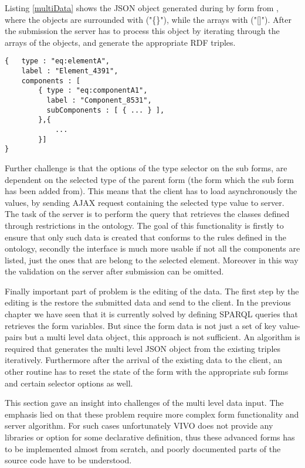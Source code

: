 Listing \ref{multiData} shows the JSON object generated during by form from , where the objects are surrounded with ("\{\}"), while the arrays with ("[]"). After the submission the server has to process this object by iterating through the arrays of the objects, and generate the appropriate RDF triples.

\begin{lstlisting}[basicstyle=\footnotesize, frame=single, caption={Multi level form data in JSON}, label=multiData, captionpos=b, belowskip=1em, aboveskip=2em]
{	type : "eq:elementA",
	label : "Element_4391",
	components : [
		{ type : "eq:componentA1",
		  label : "Component_8531",	
		  subComponents : [ { ... } ],
		},{ 
			... 
		}]
}
\end{lstlisting}

Further challenge is that the options of the type selector on the sub forms, are dependent on the selected type of the parent form (the form which the sub form has been added from). This means that the client has to load asynchronously the values, by sending AJAX request containing the selected type value to server. The task of the server is to perform the query that retrieves the classes defined through restrictions in the ontology. The goal of this functionality is firstly to ensure that only such data is created that conforms to the rules defined in the ontology, secondly the interface is much more usable if not all the components are listed, just the ones that are belong to the selected element. Moreover in this way the validation on the server after submission can be omitted.

Finally important part of problem is the editing of the data. The first step by the editing is the restore the submitted data and send to the client. In the previous chapter we have seen that it is currently solved by defining  SPARQL queries that retrieves the form variables. But since the form data is not just a set of key value-pairs but a multi level data object, this approach is not sufficient. An algorithm is required that generates the multi level JSON object from the existing triples iteratively. Furthermore after the arrival of the existing data to the client, an other routine has to reset the state of the form with the appropriate sub forms and certain selector options as well.

This section gave an insight into challenges of the multi level data input. The emphasis lied on that these problem require more complex form functionality and server algorithm. For such cases unfortunately VIVO does not provide any libraries or option for some declarative definition, thus these advanced forms has to be implemented almost from scratch, and poorly documented parts of the source code have to be understood.

